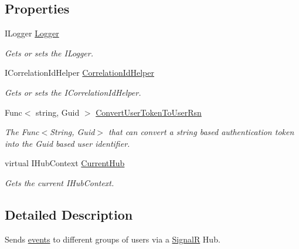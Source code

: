 \subsection*{Properties}
\begin{DoxyCompactItemize}
\item 
I\+Logger \hyperlink{classCqrs_1_1WebApi_1_1SignalR_1_1Hubs_1_1NotificationHub_a94a46d2beddc12c3920b33b53e579d36_a94a46d2beddc12c3920b33b53e579d36}{Logger}
\begin{DoxyCompactList}\small\item\em Gets or sets the I\+Logger. \end{DoxyCompactList}\item 
I\+Correlation\+Id\+Helper \hyperlink{classCqrs_1_1WebApi_1_1SignalR_1_1Hubs_1_1NotificationHub_aa65bf9c3c24588f4c36522fe7f911949_aa65bf9c3c24588f4c36522fe7f911949}{Correlation\+Id\+Helper}
\begin{DoxyCompactList}\small\item\em Gets or sets the I\+Correlation\+Id\+Helper. \end{DoxyCompactList}\item 
Func$<$ string, Guid $>$ \hyperlink{classCqrs_1_1WebApi_1_1SignalR_1_1Hubs_1_1NotificationHub_a255a9ddc4f274cab0eae62e827f3726a_a255a9ddc4f274cab0eae62e827f3726a}{Convert\+User\+Token\+To\+User\+Rsn}
\begin{DoxyCompactList}\small\item\em The Func$<$\+String, Guid$>$ that can convert a string based authentication token into the Guid based user identifier. \end{DoxyCompactList}\item 
virtual I\+Hub\+Context \hyperlink{classCqrs_1_1WebApi_1_1SignalR_1_1Hubs_1_1NotificationHub_a27c6b1d7673af05bab0305e00aef9be7_a27c6b1d7673af05bab0305e00aef9be7}{Current\+Hub}
\begin{DoxyCompactList}\small\item\em Gets the current I\+Hub\+Context. \end{DoxyCompactList}\end{DoxyCompactItemize}


\subsection{Detailed Description}
Sends \hyperlink{}{events} to different groups of users via a \hyperlink{namespaceCqrs_1_1WebApi_1_1SignalR}{SignalR} Hub. 



